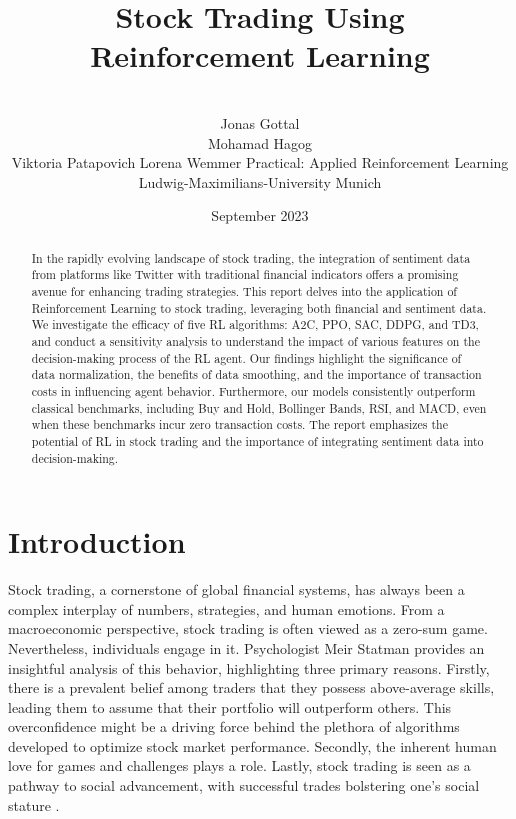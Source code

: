 \documentclass[12pt]{article}
\title{Stock Trading Using Reinforcement Learning}
\author{ \\ 
\AND
Jonas Gottal\\
\AND
Mohamad Hagog\\
\AND
Viktoria Patapovich
\AND
Lorena Wemmer
\AND
\AND
\AND
	Practical: Applied Reinforcement Learning\\
\AND
	Ludwig-Maximilians-University Munich\\
}
\date{September 2023}
\begin{document}
\maketitle

\newpage
\tableofcontents
\thispagestyle{empty}

\newpage
\thispagestyle{empty}
\begin{abstract}
In the rapidly evolving landscape of stock trading, the integration of sentiment data from platforms like Twitter with traditional financial indicators offers a promising avenue for enhancing trading strategies. This report delves into the application of Reinforcement Learning to stock trading, leveraging both financial and sentiment data. We investigate the efficacy of five RL algorithms: A2C, PPO, SAC, DDPG, and TD3, and conduct a sensitivity analysis to understand the impact of various features on the decision-making process of the RL agent. Our findings highlight the
significance of data normalization, the benefits of data smoothing, and the importance of transaction costs in influencing agent behavior. Furthermore, our models consistently outperform classical benchmarks, including Buy and Hold, Bollinger Bands, RSI, and MACD, even when these benchmarks incur zero transaction costs. The report emphasizes the potential of RL in stock trading and the importance of integrating sentiment data into decision-making.
\end{abstract}





\newpage
\setcounter{page}{1}
\section{Introduction} %




Stock trading, a cornerstone of global financial systems, has always been a complex interplay of numbers, strategies, and human emotions. From a macroeconomic perspective, stock trading is often viewed as a zero-sum game. Nevertheless, individuals engage in it. Psychologist Meir Statman provides an insightful analysis of this behavior, highlighting three primary reasons. Firstly, there is a prevalent belief among traders that they possess above-average skills, leading them to assume that their portfolio will outperform others. This overconfidence might be a driving force behind the plethora of algorithms developed to optimize stock market performance. Secondly, the inherent human love for games and challenges plays a role. Lastly, stock trading is seen as a pathway to social advancement, with successful trades bolstering one's social stature \cite{statman2002lottery}. 
\end{document}
